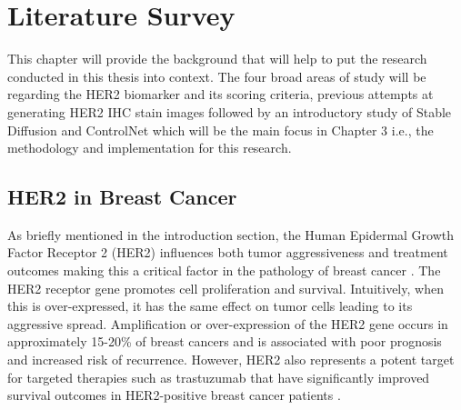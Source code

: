

\chapter{Literature Survey} %


\ifpdf
    \graphicspath{{2_LiteratureSurvey/figures/PNG/}{2_LiteratureSurvey/figures/PDF/}{2_LiteratureSurvey/figures/}}
\else
    \graphicspath{{2_LiteratureSurvey/figures/EPS/}{2_LiteratureSurvey/figures/}}
\fi


This chapter will provide the background that will help to put the research conducted in this thesis into context. The four broad areas of study will be regarding the HER2 biomarker and its scoring criteria, previous attempts at generating HER2 IHC stain images followed by an introductory study of Stable Diffusion and ControlNet which will be the main focus in Chapter 3 i.e., the methodology and implementation for this research.

\section{HER2 in Breast Cancer}

As briefly mentioned in the introduction section, the Human Epidermal Growth Factor Receptor 2 (HER2) influences both tumor aggressiveness and treatment outcomes making this a critical factor in the pathology of breast cancer \parencite{Moasser2007ThePathogenesis.}. The HER2 receptor gene promotes cell proliferation and survival. Intuitively, when this is over-expressed, it has the same effect on tumor cells leading to its aggressive spread. Amplification or over-expression of the HER2 gene occurs in approximately 15-20\% of breast cancers  \parencite{Slamon1987HumanOncogene.}  and is associated with poor prognosis and increased risk of recurrence. However, HER2 also represents a potent target for targeted therapies such as trastuzumab  \parencite{Slamon2001UseHER2}  that have significantly improved survival outcomes in HER2-positive breast cancer patients \parencite{Perez2014TrastuzumabN9831}.

